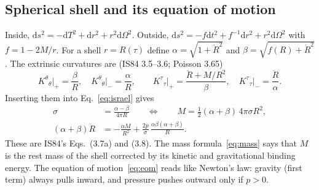 \documentclass[11pt,a4paper]{article}
\numberwithin{equation}{section}
\newcommand{\dd}{\mathrm{d}}
\begin{document}
\subsection{Spherical shell and its equation of motion}
Inside, $\dd s^2=-\dd T^2+\dd r^2+r^2\dd\Omega^2$. Outside, $\dd s^2=-f\dd t^2+f^{-1}\dd r^2+r^2\dd\Omega^2$ with $f=1-2M/r$.
For a shell $r=R(\tau)$ define $\alpha=\sqrt{1+\dot R^2}$ and $\beta=\sqrt{f(R)+\dot R^2}$. The extrinsic curvatures are
(IS84 3.5--3.6; Poisson 3.65)
\begin{equation}
K^\theta{}_\theta\big|_+=\frac{\beta}{R},\quad K^\theta{}_\theta\big|_-=\frac{\alpha}{R},\qquad
K^\tau{}_\tau\big|_+=\frac{\ddot R+M/R^2}{\beta},\quad K^\tau{}_\tau\big|_-=\frac{\ddot R}{\alpha}.
\end{equation}
Inserting them into Eq.~\eqref{eq:israel} gives
\begin{align}
\sigma&=\frac{\alpha-\beta}{4\pi R}\qquad\Longleftrightarrow\qquad M=\tfrac12(\alpha+\beta)\,4\pi\sigma R^2,\label{eq:mass}\\
(\alpha+\beta)\ddot R&=-\frac{\alpha M}{R^2}+\frac{2p}{\sigma}\,\frac{\alpha\beta(\alpha+\beta)}{R}.\label{eq:eom}
\end{align}
These are IS84's Eqs.~(3.7a) and (3.8). The mass formula~\eqref{eq:mass} says that $M$ is the rest mass of the shell
corrected by its kinetic and gravitational binding energy. The equation of motion~\eqref{eq:eom} reads like
Newton's law: gravity (first term) always pulls inward, and pressure pushes outward only if $p>0$.
\end{document}
